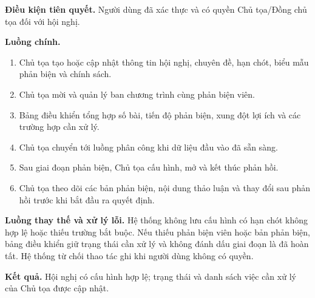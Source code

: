 \textbf{Điều kiện tiên quyết.} Người dùng đã xác thực và có quyền Chủ tọa/Đồng chủ tọa đối với hội nghị.

\textbf{Luồng chính.}

\begin{enumerate}
  \item Chủ tọa tạo hoặc cập nhật thông tin hội nghị, chuyên đề, hạn chót, biểu mẫu phản biện và chính sách.
  \item Chủ tọa mời và quản lý ban chương trình cùng phản biện viên.
  \item Bảng điều khiển tổng hợp số bài, tiến độ phản biện, xung đột lợi ích và các trường hợp cần xử lý.
  \item Chủ tọa chuyển tới luồng phân công khi dữ liệu đầu vào đã sẵn sàng.
  \item Sau giai đoạn phản biện, Chủ tọa cấu hình, mở và kết thúc phản hồi.
  \item Chủ tọa theo dõi các bản phản biện, nội dung thảo luận và thay đổi sau phản hồi trước khi bắt đầu ra quyết định.
\end{enumerate}

\textbf{Luồng thay thế và xử lý lỗi.} Hệ thống không lưu cấu hình có hạn chót không hợp lệ hoặc thiếu trường bắt buộc. Nếu thiếu phản biện viên hoặc bản phản biện, bảng điều khiển giữ trạng thái cần xử lý và không đánh dấu giai đoạn là đã hoàn tất. Hệ thống từ chối thao tác ghi khi người dùng không có quyền.

\textbf{Kết quả.} Hội nghị có cấu hình hợp lệ; trạng thái và danh sách việc cần xử lý của Chủ tọa được cập nhật.

